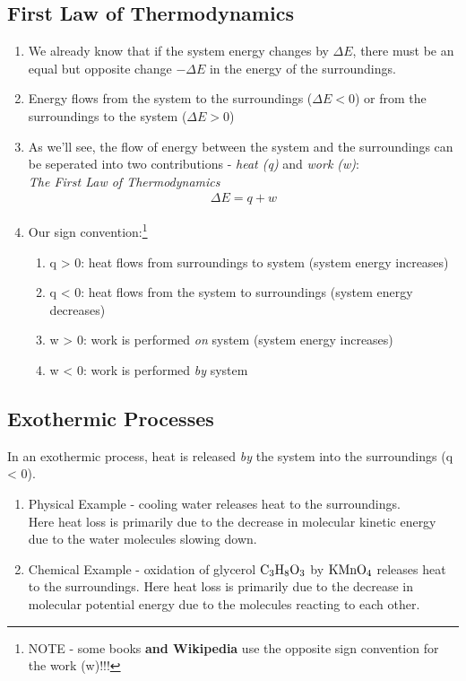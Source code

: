 \documentclass{article}  %
\begin{document}
\subsection*{First Law of Thermodynamics}
\begin{enumerate}
    \item We already know that if the system energy changes by $\Delta E$, there must be an equal but opposite change $-\Delta E$ in the energy of the surroundings.
    \item Energy flows from the system to the surroundings ($\Delta E < 0$) or from the surroundings to the system ($\Delta E > 0$)
    \item As we'll see, the flow of energy between the system and the surroundings can be seperated into two contributions - \emph{heat (q)} and \emph{work (w)}: \\
    \emph{The First Law of Thermodynamics}
        \begin{equation*}
            \begin{aligned}
                \Delta E = q + w 
            \end{aligned}
        \end{equation*}
    \item Our sign convention:\footnote{NOTE - some books \textbf{and Wikipedia} use the opposite sign convention for the work (w)!!!}
        \begin{enumerate}
            \item q > 0: heat flows from surroundings to system (system energy increases) 
            \item q < 0: heat flows from the system to surroundings (system energy decreases)
            \item w > 0: work is performed \emph{on} system (system energy increases)
            \item w < 0: work is performed \emph{by} system
        \end{enumerate}
\end{enumerate}

\subsection*{Exothermic Processes}
In an exothermic process, heat is released \emph{by} the system into the surroundings (q < 0).
\begin{enumerate}
    \item Physical Example - cooling water releases heat to the surroundings. \\
    Here heat loss is primarily due to the decrease in molecular kinetic energy due to the water molecules slowing down.
    \item Chemical Example - oxidation of glycerol $\ce{C3H8O3}$ by $\ce{KMnO4}$ releases heat to the surroundings.
    Here heat loss is primarily due to the decrease in molecular potential energy due to the molecules reacting to each other.
\end{enumerate}
\end{document}
